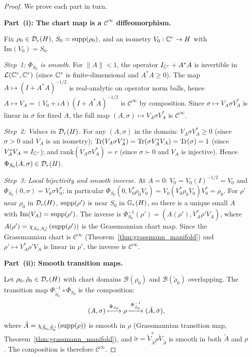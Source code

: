 \begin{proof}
We prove each part in turn.

\medskip
\noindent\textbf{Part~(i): The chart map is a $\mathcal{C}^\infty$ diffeomorphism.}

Fix $\rho_0 \in \mathcal{D}_{r}(H)$, $S_0 = \mathrm{supp}(\rho_0)$, and an isometry
$V_0: \mathbb{C}^r \to H$ with $\mathrm{Im}(V_0) = S_0$.

\emph{Step~1: $\Phi_{S_0}$ is smooth.}
For $\|A\| < 1$, the operator $I_{\mathbb{C}^r} + A^*A$ is invertible in
$\mathcal{L}(\mathbb{C}^r, \mathbb{C}^r)$ (since $\mathbb{C}^r$ is finite-dimensional and $A^*A \geq 0$).
The map $A \mapsto (I + A^*A)^{-1/2}$ is real-analytic on operator
norm balls, hence $A \mapsto V_A = (V_0 + \iota A)(I + A^*A)^{-1/2}$
is $\mathcal{C}^\infty$ by composition. Since $\sigma \mapsto V_A
\sigma V_A^*$ is linear in $\sigma$ for fixed $A$, the full map
$(A, \sigma) \mapsto V_A \sigma V_A^*$ is $\mathcal{C}^\infty$.

\emph{Step~2: Values in $\mathcal{D}_{r}(H)$.}
For any $(A, \sigma)$ in the domain: $V_A \sigma V_A^* \geq 0$ (since
$\sigma > 0$ and $V_A$ is an isometry); $\mathrm{Tr}(V_A \sigma V_A^*) =
\mathrm{Tr}(\sigma V_A^* V_A) = \mathrm{Tr}(\sigma) = 1$ (since $V_A^* V_A =
I_{\mathbb{C}^r}$); and $\mathrm{rank}(V_A \sigma V_A^*) = r$ (since
$\sigma \succ 0$ and $V_A$ is injective). Hence $\Phi_{S_0}(A,\sigma)
\in \mathcal{D}_{r}(H)$.

\emph{Step~3: Local bijectivity and smooth inverse.}
At $A = 0$: $V_0 = V_0 (I)^{-1/2} = V_0$ and $\Phi_{S_0}(0,\sigma) =
V_0 \sigma V_0^*$; in particular $\Phi_{S_0}(0, V_0^* \rho_0 V_0) =
V_0 (V_0^* \rho_0 V_0) V_0^* = \rho_0$. For $\rho'$ near $\rho_0$
in $\mathcal{D}_{r}(H)$, $\mathrm{supp}(\rho')$ is near $S_0$ in $\mathbb{G}_{r}(H)$,
so there is a unique small $A$ with $\mathrm{Im}(V_A) = \mathrm{supp}(\rho')$.
The inverse is $\Phi_{S_0}^{-1}(\rho') = (A(\rho'), V_A^* \rho' V_A)$,
where $A(\rho') = \chi_{S_0, S_0^\perp}(\mathrm{supp}(\rho'))$ is the
Grassmannian chart map. Since the Grassmannian chart is $\mathcal{C}^\infty$
(Theorem~\ref{thm:grassmann_manifold}) and $\rho' \mapsto V_A^* \rho'
V_A$ is linear in $\rho'$, the inverse is $\mathcal{C}^\infty$.

\medskip
\noindent\textbf{Part~(ii): Smooth transition maps.}

Let $\rho_0, \tilde\rho_0 \in \mathcal{D}_{r}(H)$ with chart domains
$\mathcal{B}(\rho_0)$ and $\mathcal{B}(\tilde\rho_0)$ overlapping.
The transition map $\Phi_{\tilde S_0}^{-1} \circ \Phi_{S_0}$ is the
composition:
\begin{equation*}
    (A, \sigma) \xmapsto{\Phi_{S_0}} \rho
    \xmapsto{\Phi_{\tilde S_0}^{-1}} (\tilde A, \tilde\sigma),
\end{equation*}
where $\tilde A = \chi_{\tilde S_0, \tilde S_0^\perp}(\mathrm{supp}(\rho))$
is smooth in $\rho$ (Grassmannian transition map, Theorem~\ref{thm:grassmann_manifold}),
and $\tilde\sigma = \tilde V_{\tilde A}^* \rho \tilde V_{\tilde A}$
is smooth in both $\tilde A$ and $\rho$. The composition is therefore
$\mathcal{C}^\infty$.


\end{proof}
